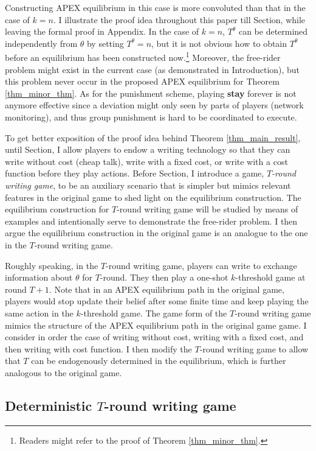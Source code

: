 \documentclass[12pt,letter]{article}
\theoremstyle{definition}
\theoremstyle{remark}
\theoremstyle{claim}
\begin{document}
Constructing APEX equilibrium in this case is more convoluted than that in the case of $k=n$. I illustrate the proof idea throughout this paper till Section, while leaving the formal proof in Appendix. In the case of $k=n$, $T^{\theta}$ can be determined independently from $\theta$ by setting $T^{\theta}=n$, but it is not obvious how to obtain $T^{\theta}$ before an equilibrium has been constructed now.\footnote{Readers might refer to the proof of Theorem \ref{thm_minor_thm}.} 
Moreover, the free-rider problem might exist in the current case (as demonstrated in Introduction), but this problem never occur in the proposed APEX equilibrium for Theorem \ref{thm_minor_thm}. As for the punishment scheme, playing \textbf{stay} forever is not anymore effective since a deviation might only seen by parts of players (network monitoring), and thus group punishment is hard to be coordinated to execute.

To get better exposition of the proof idea behind Theorem \ref{thm_main_result}, until Section, I allow players to endow a writing technology so that they can write without cost (cheap talk), write with a fixed cost, or write with a cost function before they play actions. Before Section, I introduce a game, \textit{$T$-round writing game}, to be an auxiliary scenario that is simpler but mimics relevant features in the original game to shed light on the equilibrium construction. The equilibrium construction for $T$-round writing game will be studied by means of examples and intentionally serve to demonstrate the free-rider problem. I then argue the equilibrium construction in the original game is an analogue to the one in the $T$-round writing game. 

Roughly speaking, in the $T$-round writing game, players can write to exchange information about $\theta$ for $T$-round. They then play a one-shot $k$-threshold game at round $T+1$. Note that in an APEX equilibrium path in the original game, players would stop update their belief after some finite time and keep playing the same action in the $k$-threshold game. The game form of the $T$-round writing game mimics the structure of the APEX equilibrium path in the original game game. I consider in order the case of writing without cost, writing with a fixed cost, and then writing with cost function. I then modify the $T$-round writing game to allow that $T$ can be endogenously determined in the equilibrium, which is further analogous to the original game.  

  

\subsection{Deterministic $T$-round writing game}
\end{document}
